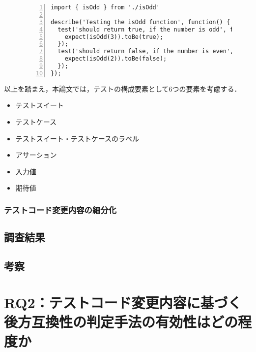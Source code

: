 \documentclass[11pt,dvipdfmx]{jreport}
\begin{document}
\begin{figure}[t]
  \begin{lstlisting}[caption={[upper/lower text]%
             \begin{tabular}[t]{@{}l@{}}
              test/sum.test.js \\[1.0\normalbaselineskip]
             \end{tabular}},frame={tb},numbers=left,label=isOdd.test.js,identifierstyle={\small}]
import { isOdd } from './isOdd'

describe('Testing the isOdd function', function() {
  test('should return true, if the number is odd', function() {
    expect(isOdd(3)).toBe(true);
  });
  test('should return false, if the number is even', function() {
    expect(isOdd(2)).toBe(false);
  });
});
\end{lstlisting}
\vspace{-6mm}
\end{figure}

以上を踏まえ，本論文では，テストの構成要素として6つの要素を考慮する．
\begin{itemize}
    \setlength{\itemsep}{0cm}
    \item テストスイート
    \item テストケース
    \item テストスイート・テストケースのラベル
    \item アサーション
    \item 入力値
    \item 期待値
\end{itemize}

\subsection{テストコード変更内容の細分化}








\section{調査結果}


\section{考察}

\chapter{RQ2：テストコード変更内容に基づく後方互換性の判定手法の有効性はどの程度か}
\end{document}
